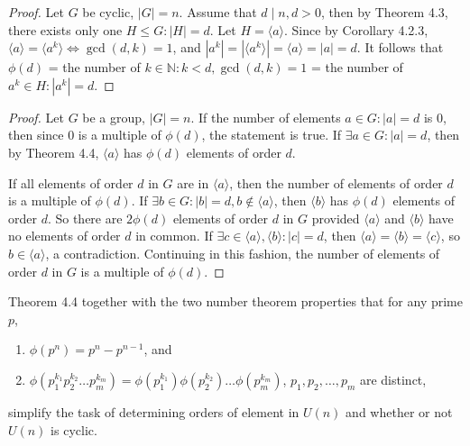 \documentclass{article}
\newtheorem{theorem}{Theorem}[section]
\newtheorem{corollary}{Corollary}[theorem]
\theoremstyle{definition}
\begin{document}
\noindent{}

\begin{proof}
    Let $G$ be cyclic, $|G|=n$. Assume that $d \mid n, d>0$, then by Theorem 4.3, there exists only one $H \leq G: |H| = d$. Let $H = \langle a \rangle$. Since by Corollary 4.2.3, $\langle a \rangle = \langle a^k \rangle \iff \gcd(d,k)=1$, and $|a^k| = |\langle a^k \rangle|  = \langle a \rangle = |a| = d$. It follows that $\phi(d)$ = the number of $k \in \mathbb{N}: k < d, \gcd(d,k)=1$ = the number of $a^k \in H: |a^k|=d$.
\end{proof}

\noindent{}

\begin{proof}
    Let $G$ be a group, $|G|=n$. If the number of elements $a \in G: |a|=d$ is 0, then since 0 is a multiple of $\phi(d)$, the statement is true. If $\exists a \in G: |a| = d$, then by Theorem 4.4, $\langle a \rangle$ has $\phi(d)$ elements of order $d$. 
    
    If all elements of order $d$ in $G$ are in $\langle a \rangle$, then the number of elements of order $d$ is a multiple of $\phi(d)$. If $\exists b \in G: |b|=d, b \notin \langle a \rangle$, then $\langle b \rangle$ has $\phi(d)$ elements of order $d$. So there are $2\phi(d)$ elements of order $d$ in $G$ provided $\langle a \rangle$ and $\langle b \rangle$ have no elements of order $d$ in common. If $\exists c \in \langle a \rangle, \langle b \rangle: |c|=d$, then $\langle a \rangle = \langle b \rangle = \langle c \rangle$, so $b \in \langle a \rangle$, a contradiction. Continuing in this fashion, the number of elements of order $d$ in $G$ is a multiple of $\phi(d)$.
\end{proof}

Theorem 4.4 together with the two number theorem properties that for any prime $p$,
\begin{enumerate}
    \item $\phi(p^n)=p^n-p^{n-1}$, and
    \item $\phi(p_1^{k_1}p_2^{k_2} \dots p_m^{k_m}) = \phi(p_1^{k_1})\phi(p_2^{k_2}) \dots \phi(p_m^{k_m})$, $p_1,p_2,\dots,p_m$ are distinct,
\end{enumerate}
simplify the task of determining orders of element in $U(n)$ and whether or not $U(n)$ is cyclic.
\end{document}
